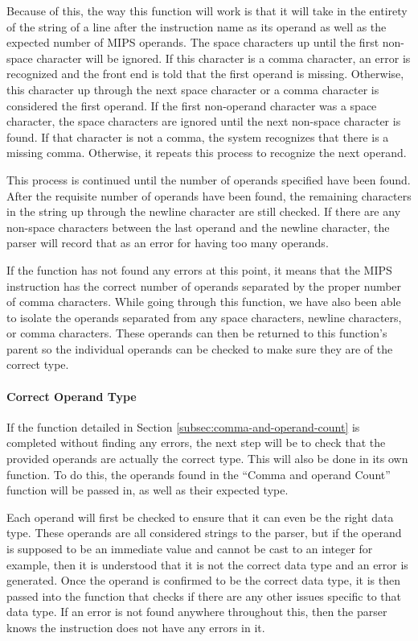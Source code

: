 \documentclass[
    paper=letter,
    parskip=half,
    fontsize=12pt,
    titlepage=firstiscover,
    toc=bibliography,
    numbers=endperiod
]{scrartcl}
\begin{document}
Because of this, the way this function will work is that it will take in
the entirety of the string of a line after the instruction name as its
operand as well as the expected number of MIPS operands. The space
characters up until the first non-space character will be ignored. If
this character is a comma character, an error is recognized and the
front end is told that the first operand is missing. Otherwise, this
character up through the next space character or a comma character is
considered the first operand. If the first non-operand character was a
space character, the space characters are ignored until the next
non-space character is found. If that character is not a comma, the
system recognizes that there is a missing comma. Otherwise, it repeats
this process to recognize the next operand.

This process is continued until the number of operands specified have
been found. After the requisite number of operands have been found, the
remaining characters in the string up through the newline character are
still checked. If there are any non-space characters between the last
operand and the newline character, the parser will record that as an
error for having too many operands.

If the function has not found any errors at this point, it means that
the MIPS instruction has the correct number of operands separated by the
proper number of comma characters. While going through this function, we
have also been able to isolate the operands separated from any space
characters, newline characters, or comma characters. These operands can
then be returned to this function's parent so the individual operands
can be checked to make sure they are of the correct type.

\paragraph{Correct Operand Type}

If the function detailed in Section \ref{subsec:comma-and-operand-count}
is completed without finding any errors, the next step will be to check
that the provided operands are actually the correct type. This will also
be done in its own function. To do this, the operands found in the
``Comma and operand Count'' function will be passed in, as well as their
expected type.

Each operand will first be checked to ensure that it can even be the
right data type. These operands are all considered strings to the
parser, but if the operand is supposed to be an immediate value and
cannot be cast to an integer for example, then it is understood that it
is not the correct data type and an error is generated. Once the operand
is confirmed to be the correct data type, it is then passed into the
function that checks if there are any other issues specific to that data
type. If an error is not found anywhere throughout this, then the parser
knows the instruction does not have any errors in it.
\end{document}

